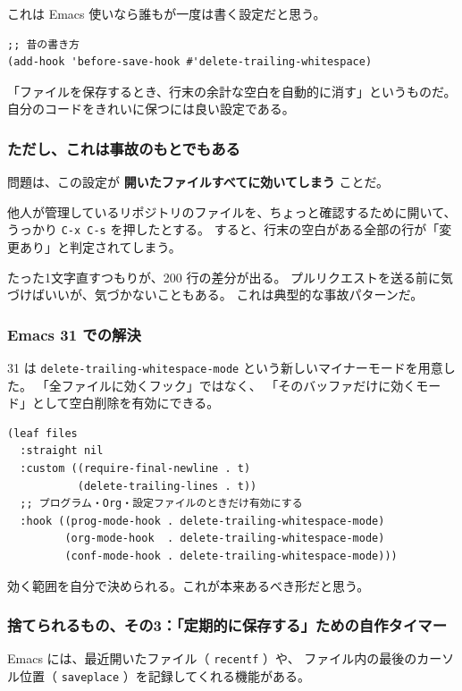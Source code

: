 \documentclass[11pt]{article}
\begin{document}
これは Emacs 使いなら誰もが一度は書く設定だと思う。

\begin{verbatim}
;; 昔の書き方
(add-hook 'before-save-hook #'delete-trailing-whitespace)
\end{verbatim}

「ファイルを保存するとき、行末の余計な空白を自動的に消す」というものだ。
自分のコードをきれいに保つには良い設定である。
\subsubsection{ただし、これは事故のもとでもある}
\label{sec:orgc9af5e4}

問題は、この設定が \textbf{開いたファイルすべてに効いてしまう} ことだ。

他人が管理しているリポジトリのファイルを、ちょっと確認するために開いて、
うっかり \texttt{C-x C-s} を押したとする。
すると、行末の空白がある全部の行が「変更あり」と判定されてしまう。

たった1文字直すつもりが、200 行の差分が出る。
プルリクエストを送る前に気づけばいいが、気づかないこともある。
これは典型的な事故パターンだ。
\subsubsection{Emacs 31 での解決}
\label{sec:org28aa548}

31 は \texttt{delete-trailing-whitespace-mode} という新しいマイナーモードを用意した。
「全ファイルに効くフック」ではなく、
「そのバッファだけに効くモード」として空白削除を有効にできる。

\begin{verbatim}
(leaf files
  :straight nil
  :custom ((require-final-newline . t)
           (delete-trailing-lines . t))
  ;; プログラム・Org・設定ファイルのときだけ有効にする
  :hook ((prog-mode-hook . delete-trailing-whitespace-mode)
         (org-mode-hook  . delete-trailing-whitespace-mode)
         (conf-mode-hook . delete-trailing-whitespace-mode)))
\end{verbatim}

効く範囲を自分で決められる。これが本来あるべき形だと思う。
\subsubsection{捨てられるもの、その3：「定期的に保存する」ための自作タイマー}
\label{sec:org2904f40}

Emacs には、最近開いたファイル（ \texttt{recentf} ）や、
ファイル内の最後のカーソル位置（ \texttt{saveplace} ）を記録してくれる機能がある。
\end{document}

